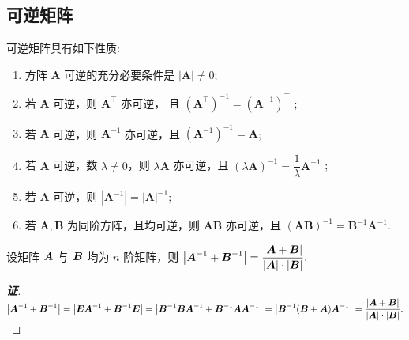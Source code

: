 \subsection{可逆矩阵}
可逆矩阵具有如下性质:
\begin{enumerate}[label=(\arabic{*})]
    \item 方阵 $ \boldsymbol{A} $ 可逆的充分必要条件是 $ |\boldsymbol{A}| \neq 0 $;
    \item 若 $ \boldsymbol{A} $ 可逆，则 $ \boldsymbol{A}^{\top} $ 亦可逆，
          且 $ \left(\boldsymbol{A}^{\top}\right)^{-1}=\left(\boldsymbol{A}^{-1}\right)^{\top}$ ;
    \item 若 $ \boldsymbol{A} $ 可逆，则 $ \boldsymbol{A}^{-1} $ 亦可逆，且 $ \left(\boldsymbol{A}^{-1}\right)^{-1}=\boldsymbol{A} $;
    \item 若 $ \boldsymbol{A} $ 可逆，数 $ \lambda \neq 0 $，则 $ \lambda \boldsymbol{A} $ 亦可逆，且 $ (\lambda \boldsymbol{A})^{-1}=\dfrac{1}{\lambda} \boldsymbol{A}^{-1}$ ;
    \item 若 $\boldsymbol{A}$ 可逆，则 $\left|\boldsymbol{A}^{-1}\right|=|\boldsymbol{A}|^{-1}$;
    \item 若 $\boldsymbol{A},\boldsymbol{B}$ 为同阶方阵，且均可逆，则 $\boldsymbol{AB}$ 亦可逆，且 $(\boldsymbol{AB})^{-1}=\boldsymbol{B}^{-1}\boldsymbol{A}^{-1}.$
\end{enumerate}

\begin{theorem}[矩阵逆的和]
    设矩阵 $\vb*{A}$ 与 $\vb*{B}$ 均为 $n$ 阶矩阵，则 $\qty|\vb*{A}^{-1}+\vb*{B}^{-1}|=\dfrac{|\vb*{A}+\vb*{B}|}{|\vb*{A}|\cdot|\vb*{B}|}.$
\end{theorem}
\begin{proof}[{\songti \textbf{证}}]
    $\qty|\vb*{A}^{-1}+\vb*{B}^{-1}|=\qty|\vb*{EA}^{-1}+\vb*{B}^{-1}\vb*{E}|=\qty|\vb*{B}^{-1}\vb*{BA}^{-1}+\vb*{B}^{-1}\vb*{AA}^{-1}|=\qty|\vb*{B}^{-1}(\vb*{B}+\vb*{A})\vb*{A}^{-1}|=\dfrac{|\vb*{A}+\vb*{B}|}{|\vb*{A}|\cdot|\vb*{B}|}.$
\end{proof}


